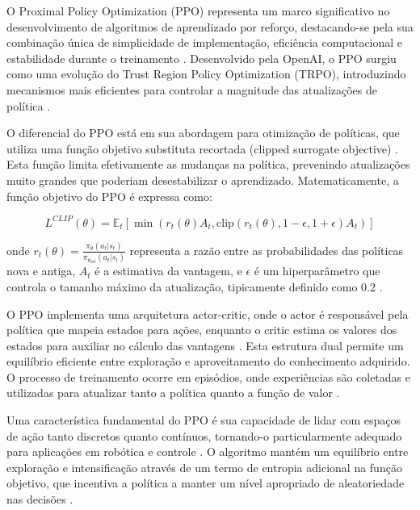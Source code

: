 O Proximal Policy Optimization (PPO) representa um marco significativo no desenvolvimento de algoritmos de aprendizado por reforço, destacando-se pela sua combinação única de simplicidade de implementação, eficiência computacional e estabilidade durante o treinamento \cite{https://arxiv.org/abs/1707.06347}. Desenvolvido pela OpenAI, o PPO surgiu como uma evolução do Trust Region Policy Optimization (TRPO), introduzindo mecanismos mais eficientes para controlar a magnitude das atualizações de política \cite{https://spinningup.openai.com/en/latest/algorithms/ppo.html}.

O diferencial do PPO está em sua abordagem para otimização de políticas, que utiliza uma função objetivo substituta recortada (clipped surrogate objective) \cite{https://www.datacamp.com/pt/tutorial/proximal-policy-optimization}. Esta função limita efetivamente as mudanças na política, prevenindo atualizações muito grandes que poderiam desestabilizar o aprendizado. Matematicamente, a função objetivo do PPO é expressa como:

\begin{equation}
L^{CLIP}(\theta) = \mathbb{E}_t \left[ \min\left( r_t(\theta) A_t, \text{clip}(r_t(\theta), 1-\epsilon, 1+\epsilon) A_t \right) \right]
\end{equation}

onde $r_t(\theta) = \frac{\pi_\theta(a_t|s_t)}{\pi_{\theta_{old}}(a_t|s_t)}$ representa a razão entre as probabilidades das políticas nova e antiga, $A_t$ é a estimativa da vantagem, e $\epsilon$ é um hiperparâmetro que controla o tamanho máximo da atualização, tipicamente definido como 0.2 \cite{https://iclr-blog-track.github.io/2022/03/25/ppo-implementation-details/}.

O PPO implementa uma arquitetura actor-critic, onde o actor é responsável pela política que mapeia estados para ações, enquanto o critic estima os valores dos estados para auxiliar no cálculo das vantagens \cite{https://pytorch.org/rl/main/tutorials/coding_ppo.html}. Esta estrutura dual permite um equilíbrio eficiente entre exploração e aproveitamento do conhecimento adquirido. O processo de treinamento ocorre em episódios, onde experiências são coletadas e utilizadas para atualizar tanto a política quanto a função de valor \cite{https://stable-baselines3.readthedocs.io/en/master/modules/ppo.html}.

Uma característica fundamental do PPO é sua capacidade de lidar com espaços de ação tanto discretos quanto contínuos, tornando-o particularmente adequado para aplicações em robótica e controle \cite{https://petmec.uff.br/wp-content/uploads/sites/288/2021/09/Mexas_TCC2.pdf}. O algoritmo mantém um equilíbrio entre exploração e intensificação através de um termo de entropia adicional na função objetivo, que incentiva a política a manter um nível apropriado de aleatoriedade nas decisões \cite{https://www.toolify.ai/pt/ai-news-pt/introduo-ao-proximal-policy-optimization-ppo-no-aprendizado-profundo-por-reforo-1059924}.

